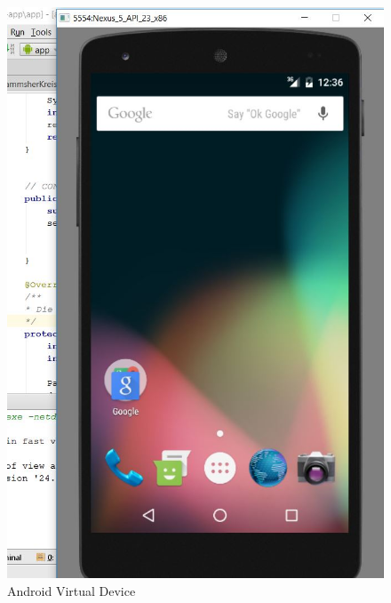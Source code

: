\begin{figure}[!tbp]
\begin{minipage}[b]{0.4\textwidth}
		\includegraphics[width=\textwidth]{images/AVD.jpg}
		\caption{Android Virtual Device}
	\end{minipage}
\end{figure}


\clearpage %